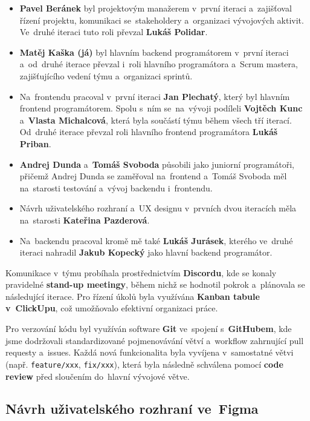 \documentclass[male,czech,api_bc]{kitheses}
\begin{document}
\begin{itemize}
	\item \textbf{Pavel Beránek} byl projektovým manažerem v~první iteraci a~zajišťoval řízení projektu, komunikaci se~stakeholdery a~organizaci vývojových aktivit. Ve~druhé iteraci tuto roli převzal \textbf{Lukáš Polidar}.
	\item \textbf{Matěj Kaška (já)} byl hlavním backend programátorem v~první iteraci a~od~druhé iterace převzal i~roli hlavního programátora a~Scrum mastera, zajišťujícího vedení týmu a~organizaci sprintů.
	\item Na~frontendu pracoval v~první iteraci \textbf{Jan Plechatý}, který byl hlavním frontend programátorem. Spolu s~ním se~na~vývoji podíleli \textbf{Vojtěch Kunc} a~\textbf{Vlasta Michalcová}, která byla součástí týmu během všech tří iterací. Od~druhé iterace převzal roli hlavního frontend programátora \textbf{Lukáš Priban}.
	\item \textbf{Andrej Dunda} a~\textbf{Tomáš Svoboda} působili jako juniorní programátoři, přičemž Andrej Dunda se zaměřoval na~frontend a~Tomáš Svoboda měl na~starosti testování a~vývoj backendu i~frontendu.
	\item Návrh uživatelského rozhraní a~UX designu v~prvních dvou iteracích měla na~starosti \textbf{Kateřina Pazderová}.
	\item Na~backendu pracoval kromě mě také \textbf{Lukáš Jurásek}, kterého ve~druhé iteraci nahradil \textbf{Jakub Kopecký} jako hlavní backend programátor.
\end{itemize}

Komunikace v~týmu probíhala prostřednictvím \textbf{Discordu}, kde se konaly pravidelné \textbf{stand-up meetingy}, během nichž se hodnotil pokrok a~plánovala se následující iterace. Pro řízení úkolů byla využívána \textbf{Kanban tabule v~ClickUpu}, což umožňovalo efektivní organizaci práce.

Pro verzování kódu byl využíván software \textbf{Git} ve~spojení s~\textbf{GitHubem}, kde jsme dodržovali standardizované pojmenovávání větví a~workflow zahrnující pull requesty a~issues. Každá nová funkcionalita byla vyvíjena v~samostatné větvi (např. \texttt{feature/xxx}, \texttt{fix/xxx}), která byla následně schválena pomocí \textbf{code review} před sloučením do~hlavní vývojové větve.

\subsection{Návrh uživatelského rozhraní ve~Figma}
\end{document}

